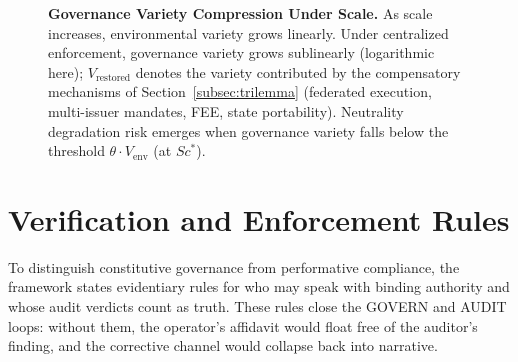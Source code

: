 \documentclass{article}
\begin{document}
\begin{figure}[htbp]
\centering
{}
\caption{\textbf{Governance Variety Compression Under Scale.} As scale increases, environmental variety grows linearly. Under centralized enforcement, governance variety grows sublinearly (logarithmic here); $V_{\text{restored}}$ denotes the variety contributed by the compensatory mechanisms of Section~\ref{subsec:trilemma} (federated execution, multi-issuer mandates, FEE, state portability). Neutrality degradation risk emerges when governance variety falls below the threshold $\theta \cdot V_{\text{env}}$ (at $Sc^*$).}
\label{fig:variety-compression}
\end{figure}

\section{Verification and Enforcement Rules}
\label{appendix:rules}

To distinguish constitutive governance from performative compliance, the framework states evidentiary rules for who may speak with binding authority and whose audit verdicts count as truth. These rules close the GOVERN and AUDIT loops: without them, the operator's affidavit would float free of the auditor's finding, and the corrective channel would collapse back into narrative.
\end{document}
